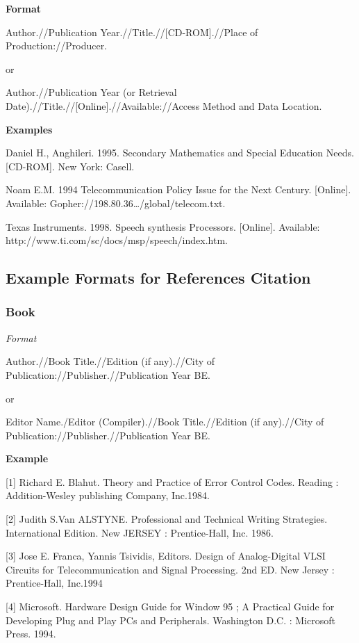 \textbf{Format}

Author.//Publication Year.//Title.//[CD-ROM].//Place of Production://Producer.

or

Author.//Publication Year (or Retrieval Date).//Title.//[Online].//Available://Access Method and Data Location.

\textbf{Examples}

Daniel H., Anghileri. 1995. Secondary Mathematics and Special Education Needs. [CD-ROM]. New York: Casell.

Noam E.M. 1994 Telecommunication Policy Issue for the Next Century. [Online]. Available: Gopher://198.80.36…/global/telecom.txt.

Texas Instruments. 1998. Speech synthesis Processors. [Online]. Available: http://www.ti.com/sc/docs/msp/speech/index.htm.

\subsection{Example Formats for References Citation}

\subsubsection{Book}

\textit{Format}

Author.//Book Title.//Edition (if any).//City of Publication://Publisher.//Publication Year BE.

or

Editor Name./Editor (Compiler).//Book Title.//Edition (if any).//City of Publication://Publisher.//Publication Year BE.

\textbf{Example}

[1] Richard E. Blahut. Theory and Practice of Error Control Codes. Reading : Addition-Wesley publishing Company, Inc.1984.

[2] Judith S.Van ALSTYNE. Professional and Technical Writing Strategies. International Edition. New JERSEY : Prentice-Hall, Inc. 1986.

[3] Jose E. Franca, Yannis Tsividis, Editors. Design of Analog-Digital VLSI Circuits for Telecommunication and Signal Processing. 2nd ED. New Jersey : Prentice-Hall, Inc.1994

[4] Microsoft. Hardware Design Guide for Window 95 ; A Practical Guide for Developing Plug and Play PCs and Peripherals. Washington D.C. : Microsoft Press. 1994.

